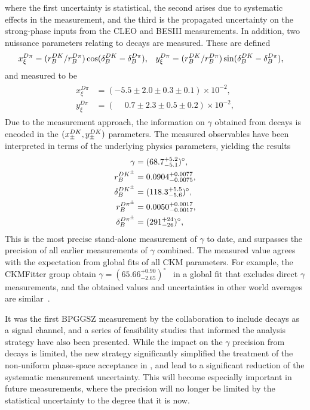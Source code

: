 where the first uncertainty is statistical, the second arises due to systematic effects in the measurement, and the third is the propagated uncertainty on the strong-phase inputs from the CLEO and BESIII measurements. In addition, two nuissance parameters relating to \BtoDpi decays are measured. These are defined
\begin{align}
    x_\xi^{{D}\pi} &= (r_B^{DK}/r_B^{D\pi}) \cos (\delta_B^{DK} - \delta_B^{D\pi}), & 
    y_\xi^{{D}\pi} &= (r_B^{DK}/r_B^{D\pi}) \sin (\delta_B^{DK} - \delta_B^{D\pi}),
\end{align}
and measured to be
\begin{align}
\begin{split}
    x_\xi^{D\pi} & = (         - 5.5 \pm 2.0 \pm  0.3\pm 0.1) \times 10^{-2}, \\
    y_\xi^{D\pi} & = (\phantom{-}0.7 \pm 2.3 \pm  0.5\pm 0.2) \times 10^{-2}, 
\end{split}
\end{align}
Due to the measurement approach, the information on $\gamma$ obtained from \BtoDpi decays is encoded in the $(x_\pm^{{D}{K}}, y_\pm^{{D}{K}})$ parameters. The measured observables have been interpreted in terms of the underlying physics parameters, yielding the results
\begin{align}
\begin{split}\label{eq:phys_results}
    \gamma          &= (68.7^{+5.2}_{-5.1})^\circ, \\
    r_B^{{{D}{{K}^\pm}}}       &= 0.0904^{+0.0077}_{-0.0075}, \\
    \delta_B^{{{D}{{K}^\pm}}}  &= (118.3^{+5.5}_{-5.6})^\circ, \\
    r_B^{D\pi^\pm}      &= 0.0050^{+0.0017}_{-0.0017}, \\
    \delta_B^{D\pi^\pm} &= (291^{+24}_{-26})^\circ,
\end{split}
\end{align}
This is the most precise stand-alone measurement of $\gamma$ to date, and surpasses the precision of all earlier measurements of $\gamma$ combined. The measured value agrees with the expectation from global fits of all CKM parameters. For example, the CKMFitter group obtain  $\gamma = (65.66^{+0.90}_{-2.65})^\circ $~\cite{CKMfitter2015} in a global fit that excludes direct $\gamma$ measurements, and the obtained values and uncertainties in other world averages are similar~\cite{HFLAV,UTfit-UT}.

 It was the first  BPGGSZ measurement by the \lhcb collaboration to include \BtoDpi decays as a signal channel, and a series of feasibility studies that informed the analysis strategy have also been presented. While the impact on the $\gamma$ precision from \BtoDpi decays is limited, the new strategy significantly simplified the treatment of the non-uniform phase-space acceptance in \lhcb, and lead to a significant reduction of the systematic measurement uncertainty. This will become especially important in future measurements, where the precision will no longer be limited by the statistical uncertainty to the degree that it is now.

